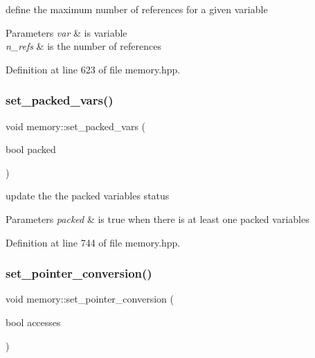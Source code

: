 define the maximum number of references for a given variable 


\begin{DoxyParams}{Parameters}
{\em var} & is variable \\
\hline
{\em n\+\_\+refs} & is the number of references \\
\hline
\end{DoxyParams}


Definition at line 623 of file memory.\+hpp.

\mbox{\label{classmemory_ad8729b135f5676bc9cb69047d4bf4120}} 
\subsubsection{\texorpdfstring{set\+\_\+packed\+\_\+vars()}{set\_packed\_vars()}}
{\footnotesize\ttfamily void memory\+::set\+\_\+packed\+\_\+vars (\begin{DoxyParamCaption}\item[{bool}]{packed }\end{DoxyParamCaption})\hspace{0.3cm}{\ttfamily [inline]}}



update the the packed variables status 


\begin{DoxyParams}{Parameters}
{\em packed} & is true when there is at least one packed variables \\
\hline
\end{DoxyParams}


Definition at line 744 of file memory.\+hpp.

\mbox{\label{classmemory_ac3c4105219a8035042d60ba076502ea4}} 
\subsubsection{\texorpdfstring{set\+\_\+pointer\+\_\+conversion()}{set\_pointer\_conversion()}}
{\footnotesize\ttfamily void memory\+::set\+\_\+pointer\+\_\+conversion (\begin{DoxyParamCaption}\item[{bool}]{accesses }\end{DoxyParamCaption})\hspace{0.3cm}{\ttfamily [inline]}}



